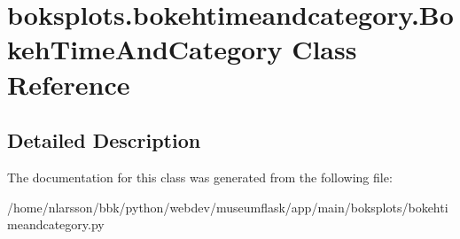\hypertarget{classboksplots_1_1bokehtimeandcategory_1_1BokehTimeAndCategory}{}\section{boksplots.\+bokehtimeandcategory.\+Bokeh\+Time\+And\+Category Class Reference}
\label{classboksplots_1_1bokehtimeandcategory_1_1BokehTimeAndCategory}


\subsection{Detailed Description}


 

The documentation for this class was generated from the following file\+:\begin{DoxyCompactItemize}
\item 
/home/nlarsson/bbk/python/webdev/museumflask/app/main/boksplots/bokehtimeandcategory.\+py\end{DoxyCompactItemize}
